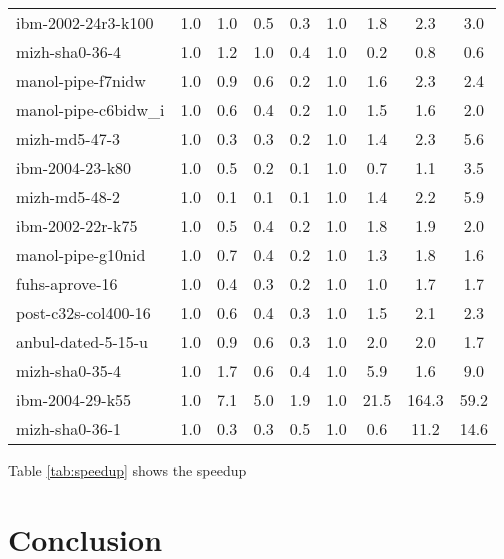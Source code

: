 \documentclass[letterpaper, compsoc, conference]{IEEEtran}
\begin{document}
\begin{table*}[htbp]
\begin{center}
\begin{tabular}{|l|c|c|c|c|c|c|c|c|}
        ibm-2002-24r3-k100                       &    1.0 &    1.0 &    0.5 &    0.3 &    1.0 &    1.8 &    2.3 &    3.0 \\
        mizh-sha0-36-4                           &    1.0 &    1.2 &    1.0 &    0.4 &    1.0 &    0.2 &    0.8 &    0.6 \\
        manol-pipe-f7nidw                        &    1.0 &    0.9 &    0.6 &    0.2 &    1.0 &    1.6 &    2.3 &    2.4 \\
        manol-pipe-c6bidw\_i                     &    1.0 &    0.6 &    0.4 &    0.2 &    1.0 &    1.5 &    1.6 &    2.0 \\
        mizh-md5-47-3                            &    1.0 &    0.3 &    0.3 &    0.2 &    1.0 &    1.4 &    2.3 &    5.6 \\
        ibm-2004-23-k80                          &    1.0 &    0.5 &    0.2 &    0.1 &    1.0 &    0.7 &    1.1 &    3.5 \\
        mizh-md5-48-2                            &    1.0 &    0.1 &    0.1 &    0.1 &    1.0 &    1.4 &    2.2 &    5.9 \\
        ibm-2002-22r-k75                         &    1.0 &    0.5 &    0.4 &    0.2 &    1.0 &    1.8 &    1.9 &    2.0 \\
        manol-pipe-g10nid                        &    1.0 &    0.7 &    0.4 &    0.2 &    1.0 &    1.3 &    1.8 &    1.6 \\
        fuhs-aprove-16                           &    1.0 &    0.4 &    0.3 &    0.2 &    1.0 &    1.0 &    1.7 &    1.7 \\
        post-c32s-col400-16                      &    1.0 &    0.6 &    0.4 &    0.3 &    1.0 &    1.5 &    2.1 &    2.3 \\
        anbul-dated-5-15-u                       &    1.0 &    0.9 &    0.6 &    0.3 &    1.0 &    2.0 &    2.0 &    1.7 \\
        mizh-sha0-35-4                           &    1.0 &    1.7 &    0.6 &    0.4 &    1.0 &    5.9 &    1.6 &    9.0 \\
        ibm-2004-29-k55                          &    1.0 &    7.1 &    5.0 &    1.9 &    1.0 &   21.5 &  164.3 &   59.2 \\
        mizh-sha0-36-1                           &    1.0 &    0.3 &    0.3 &    0.5 &    1.0 &    0.6 &   11.2 &   14.6 \\
        \hline
    \end{tabular}
    \end{center}
    \caption{Speedup of parallel SAT solvers as $n$ (number of cores) is
    varied. Speedup is computed using Minisat 2.2 as the baseline. }
    \label{tab:speedup}
\end{table*}
Table \ref{tab:speedup} shows the speedup

\section{Conclusion}



\end{document}
